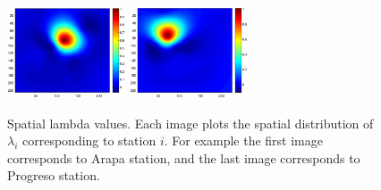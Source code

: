 \documentclass[10pt,letterpaper,conference]{ieeeconf}
\begin{document}
\begin{figure}[ht]
\includegraphics[width=3.5cm]{AreaweightMunani}
\includegraphics[width=3.5cm]{AreaweightProgreso}
\endce
\caption{Spatial lambda values. Each image plots the spatial distribution of 
$\lambda_i$ corresponding to station $i$. For example the first image 
corresponds to Arapa station, and the last image corresponds to Progreso 
station.}
\label{fig:LambdaImages}
\end{figure}
\end{document}
